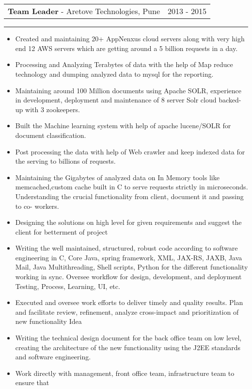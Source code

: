 \documentclass[10pt,A4]{article}
\newcommand{\cvevent}[4]
{

\begin{tabular*}{1\textwidth}{p{13.6cm}  x{3.9cm}}
	\textbf{#2} - \textcolor{bgcol}{#3} &   \vspace{2.0pt}\textcolor{sectcol}{#1}
\end{tabular*}

\vspace{-8pt}
\textcolor{softcol}{\hrule}
\vspace{6pt}

  #4 

}
\begin{document}
\ \\ \\

\cvevent{2013 - 2015}
{Team Leader}
{Aretove Technologies, Pune}
{
\begin{itemize}

\item Created and maintaining 20+ AppNenxus cloud servers along with very high end 12 AWS servers which are getting around a 5 billion requests in a day.

\item Processing and Analyzing Terabytes of data with the help of Map reduce 
technology and dumping analyzed data to mysql for the reporting.

\item Maintaining around 100 Million documents using Apache SOLR, experience in
development, deployment and maintenance of 8 server Solr cloud backed-up with 3
zookeepers.
\item Built the Machine learning system with help of apache lucene/SOLR for document
classification.
\item Post processing the data with help of Web crawler and keep indexed data for the
serving to billions of requests.
\item Maintaining the Gigabytes of analyzed data on In Memory tools like
memcached,custom cache built in C to serve requests strictly in microseconds.
Understanding the crucial functionality from client, document it and passing to co-
workers.
\item Designing the solutions on high level for given requirements and suggest the client for
betterment of project
\item Writing the well maintained, structured, robust code according to software engineering
in C, Core Java, spring framework, XML, JAX-RS, JAXB, Java Mail, Java
Multithreading, Shell scripts, Python for the different functionality working in sync.
Oversee workflow for design, development, and deployment Testing, Process,
Learning, UI, etc.
\item Executed and oversee work efforts to deliver timely and quality results.
Plan and facilitate review, refinement, analyze cross-impact and prioritization of
new functionality Idea
\item Writing the technical design document for the back office team on low level,
creating the architecture of the new functionality using the J2EE standards and software
engineering.
\item Work directly with management, front office team, infrastructure team to ensure that

\end{itemize}}
\end{document}
